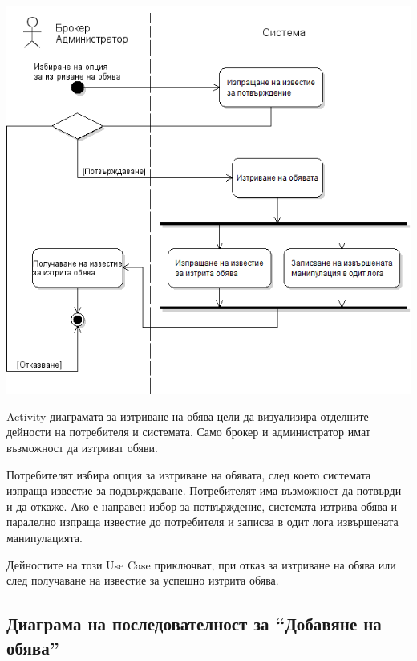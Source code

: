 \documentclass[a4paper]{article}
\begin{document}
\begin{center}
\includegraphics[scale=0.6,keepaspectratio=true]{uml08}
\end{center}

Activity диаграмата за изтриване на обява цели да 
визуализира отделните дейности на потребителя и 
системата. Само брокер и администратор имат възможност да 
изтриват обяви.

Потребителят избира опция за изтриване на обявата, след 
което системата изпраща известие за подвърждаване. 
Потребителят има възможност да потвърди и да откаже. Ако 
е направен избор за потвърждение, системата изтрива обява 
и паралелно изпраща известие до потребителя и записва в 
одит лога извършената манипулацията.

Дейностите на този Use Case приключват, при отказ за 
изтриване на обява или след получаване на известие за 
успешно изтрита обява.

\clearpage
\subsection{Диаграма на последователност за ``Добавяне на обява''} %
\end{document}
